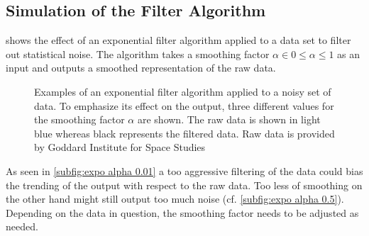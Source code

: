         \subsection{Simulation of the Filter Algorithm}\label{sec:A9 simu of the filter algo}%
             shows the effect of an exponential filter algorithm applied to a data set to filter
            out statistical noise. The algorithm takes a smoothing factor \(\alpha \in 0 \leq \alpha \leq 1\) as an input and outputs
            a smoothed representation of the raw data.\par 
            \begin{figure}[H]
                \centering
                \subfloat[Expo-smoothing at \(\alpha = 0.01\).\label{subfig:expo alpha 0.01}]{}
            \end{figure}
            \begin{figure}[H]\ContinuedFloat
                \centering
                \subfloat[Expo-smoothing at \(\alpha = 0.05\).\label{subfig:expo alpha 0.05}]{}
            \end{figure}
            \begin{figure}[H]\ContinuedFloat
                \centering
                \subfloat[Expo-smoothing at \(\alpha = 0.5\).\label{subfig:expo alpha 0.5}]{}
                \caption[Examples of an exponential filter algorithm applied to a noisy set of data]{Examples of an exponential
                filter algorithm applied to a noisy set of data. To emphasize its effect on the output, three different values for the smoothing factor \(\alpha\) are shown.
                The raw data is shown in light blue whereas black represents the filtered data. Raw data is provided by Goddard Institute for Space Studies \cite{GISS.nasa.surface.temperature.analysis.20210120}}
                \label{fig:all expo filtered samples}
            \end{figure}
            As seen in \cref{subfig:expo alpha 0.01} a too aggressive filtering of the data could bias the trending of the output
            with respect to the raw data. Too less of smoothing on the other hand might still output too much noise (cf. \cref{subfig:expo alpha 0.5}).
            Depending on the data in question, the smoothing factor needs to be adjusted as needed.
